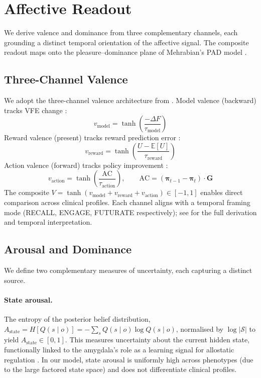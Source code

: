 \documentclass[11pt,a4paper]{article}
\begin{document}
\section{Affective Readout}\label{sec:affect}

We derive valence and dominance from three complementary channels, each grounding a distinct temporal orientation of the affective signal. The composite readout maps onto the pleasure--dominance plane of Mehrabian's PAD model \citep{mehrabian1996pleasure}.

\subsection{Three-Channel Valence}

We adopt the three-channel valence architecture from \citet{albarracin2026temporal}. Model valence (backward) tracks VFE change \citep{joffily2013emotional}:
\begin{equation}
    v_{\text{model}} = \tanh\!\left(\frac{-\Delta F}{\tau_{\text{model}}}\right)
\end{equation}
Reward valence (present) tracks reward prediction error \citep{pattisapu2024free}:
\begin{equation}
    v_{\text{reward}} = \tanh\!\left(\frac{U - \mathbb{E}[U]}{\tau_{\text{reward}}}\right)
\end{equation}
Action valence (forward) tracks policy improvement \citep{hesp2021deeply}:
\begin{equation}
    v_{\text{action}} = \tanh\!\left(\frac{\text{AC}}{\tau_{\text{action}}}\right), \qquad \text{AC} = (\boldsymbol{\pi}_{t-1} - \boldsymbol{\pi}_t) \cdot \mathbf{G}
\end{equation}
The composite $V = \tanh(v_{\text{model}} + v_{\text{reward}} + v_{\text{action}}) \in [-1, 1]$ enables direct comparison across clinical profiles. Each channel aligns with a temporal framing mode (RECALL, ENGAGE, FUTURATE respectively); see \citet{albarracin2026temporal} for the full derivation and temporal interpretation.

\subsection{Arousal and Dominance}

We define two complementary measures of uncertainty, each capturing a distinct source.

\paragraph{State arousal.} The entropy of the posterior belief distribution, $A_{\text{state}} = H[Q(s \mid o)] = -\sum_s Q(s \mid o) \log Q(s \mid o)$, normalised by $\log |\mathcal{S}|$ to yield $A_{\text{state}} \in [0, 1]$. This measures uncertainty about the current hidden state, functionally linked to the amygdala's role as a learning signal for allostatic regulation \citep{barrett2017theory}. In our model, state arousal is uniformly high across phenotypes (due to the large factored state space) and does not differentiate clinical profiles.
\end{document}
